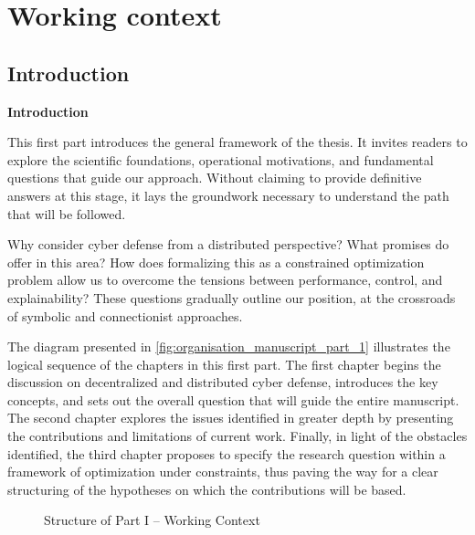 \clearpage
\thispagestyle{empty}
\null
\newpage

\cleardoublepage
{}
\part{Working context}
\label{part:context}

\clearpage
\thispagestyle{empty}
\null
\newpage

\chapter*{Introduction}
 {\textbf{Introduction}}

\noindent
This first part introduces the general framework of the thesis. It invites readers to explore the scientific foundations, operational motivations, and fundamental questions that guide our approach. Without claiming to provide definitive answers at this stage, it lays the groundwork necessary to understand the path that will be followed.

\medskip

\noindent
Why consider cyber defense from a distributed perspective? What promises do  offer in this area? How does formalizing this as a constrained optimization problem allow us to overcome the tensions between performance, control, and explainability? These questions gradually outline our position, at the crossroads of symbolic and connectionist approaches.

\medskip

\noindent
The diagram presented in \autoref{fig:organisation_manuscript_part_1} illustrates the logical sequence of the chapters in this first part. The first chapter begins the discussion on decentralized and distributed cyber defense, introduces the key concepts, and sets out the overall question that will guide the entire manuscript. The second chapter explores the issues identified in greater depth by presenting the contributions and limitations of current work. Finally, in light of the obstacles identified, the third chapter proposes to specify the research question within a framework of optimization under constraints, thus paving the way for a clear structuring of the hypotheses on which the contributions will be based.

\begin{figure}[h!]
  \centering
  \resizebox{0.8\textwidth}{!}{%
    
  }
  \caption{Structure of Part I -- Working Context}
  \label{fig:organisation_manuscript_part_1}
\end{figure}

